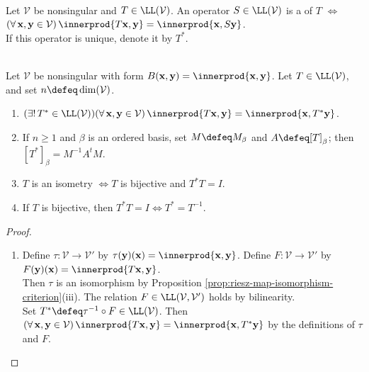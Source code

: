 \begin{definition} \label{def:metric-adjoint-nonsingular-form} \\
Let $\mathcal{V}$ be nonsingular and $T\in\LL(\mathcal{V})$. An operator $S\in\LL(\mathcal{V})$ is a  of $T$ $\Longleftrightarrow$ $(\forall\,\mathbf{x},\mathbf{y}\in\mathcal{V})\,\innerprod{T\mathbf{x},\mathbf{y}}=\innerprod{\mathbf{x},S\mathbf{y}}$.\\
If this operator is unique, denote it by $T^*$.
\end{definition}

\begin{proposition} \label{prop:metric-adjoints-and-isometries} \\
Let $\mathcal{V}$ be nonsingular with form $B(\mathbf{x},\mathbf{y})=\innerprod{\mathbf{x},\mathbf{y}}$. Let $T\in\LL(\mathcal{V})$, and set $n\defeq\dim(\mathcal{V})$.
\begin{enumerate}[label=(\roman*)]
\setlength{\itemsep}{0pt}
\item $(\exists!\,T^*\in\LL(\mathcal{V}))(\forall\,\mathbf{x},\mathbf{y}\in\mathcal{V})\,\innerprod{T\mathbf{x},\mathbf{y}}=\innerprod{\mathbf{x},T^*\mathbf{y}}$.
\item If $n\geq1$ and $\beta$ is an ordered basis, set $M\defeq M_{\beta}$ and $A\defeq[T]_{\beta}$; then $[T^*]_{\beta}=M^{-1}A^tM$.
\item $T$ is an isometry $\Longleftrightarrow T$ is bijective and $T^*T=I$.
\item If $T$ is bijective, then $T^*T=I\Longleftrightarrow T^*=T^{-1}$.
\end{enumerate}
\begin{proof}
\begin{enumerate}[label=(\roman*)]
\setlength{\itemsep}{0pt}
\item[$(i)$] Define $\tau:\mathcal{V}\to\mathcal{V}'$ by $\tau(\mathbf{y})(\mathbf{x})=\innerprod{\mathbf{x},\mathbf{y}}$. Define $F:\mathcal{V}\to\mathcal{V}'$ by $F(\mathbf{y})(\mathbf{x})=\innerprod{T\mathbf{x},\mathbf{y}}$.\\
Then $\tau$ is an isomorphism by Proposition \ref{prop:riesz-map-isomorphism-criterion}(iii). The relation $F\in\LL(\mathcal{V},\mathcal{V}')$ holds by bilinearity.\\
Set $T^*\defeq\tau^{-1}\circ F\in\LL(\mathcal{V})$. Then $(\forall\,\mathbf{x},\mathbf{y}\in\mathcal{V})\,\innerprod{T\mathbf{x},\mathbf{y}}=\innerprod{\mathbf{x},T^*\mathbf{y}}$ by the definitions of $\tau$ and $F$.\\

\end{enumerate}
\end{proof}
\end{proposition}

